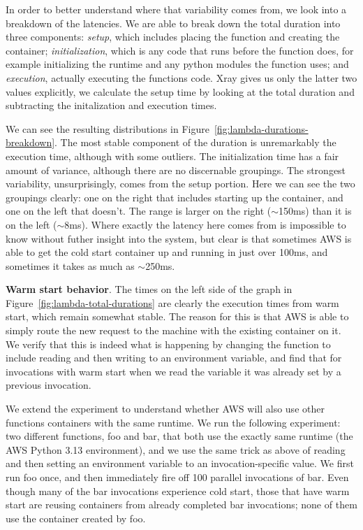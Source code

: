 In order to better understand where that variability comes from, we look into a
breakdown of the latencies. We are able to break down the total duration into
three components: \textit{setup}, which includes placing the function and
creating the container; \textit{initialization}, which is any code that runs
before the function does, for example initializing the runtime and any python
modules the function uses; and \textit{execution}, actually executing the
functions code. Xray gives us only the latter two values explicitly, we
calculate the setup time by looking at the total duration and subtracting the
initalization and execution times. 

We can see the resulting distributions in
Figure~\ref{fig:lambda-durations-breakdown}. The most stable component of the
duration is unremarkably the execution time, although with some outliers. The
initialization time has a fair amount of variance, although there are no
discernable groupings. The strongest variability, unsurprisingly, comes from the
setup portion. Here we can see the two groupings clearly: one on the right that
includes starting up the container, and one on the left that doesn't. The range
is larger on the right ($\sim$150ms) than it is on the left ($\sim$8ms). Where
exactly the latency here comes from is impossible to know without futher insight
into the system, but clear is that sometimes AWS is able to get the cold start
container up and running in just over 100ms, and sometimes it takes as much as
$\sim$250ms.


\textbf{Warm start behavior}. 
% 
The times on the left side of the graph in
Figure~\ref{fig:lambda-total-durations} are clearly the execution times from
warm start, which remain somewhat stable. The reason for this is that AWS is
able to simply route the new request to the machine with the existing container
on it. We verify that this is indeed what is happening by changing the function
to include reading and then writing to an environment variable, and find that
for invocations with warm start when we read the variable it was already set by
a previous invocation.

We extend the experiment to understand whether AWS will also use other functions
containers with the same runtime. We run the following experiment: two different
functions, foo and bar, that both use the exactly same runtime (the AWS Python
3.13 environment), and we use the same trick as above of reading and then
setting an environment variable to an invocation-specific value. We first run
foo once, and then immediately fire off 100 parallel invocations of bar. Even
though many of the bar invocations experience cold start, those that have warm
start are reusing containers from already completed bar invocations; none of
them use the container created by foo. 


